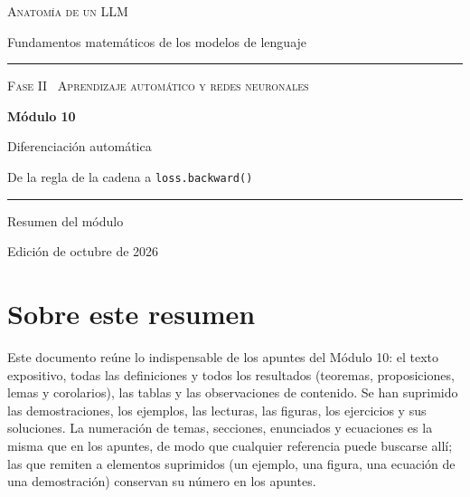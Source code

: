 \documentclass[11pt,a4paper,twoside,openany]{book}
\begin{document}
\frontmatter
\begin{titlepage}
\centering
\vspace*{2.5cm}
{\large\scshape Anatomía de un LLM}\par
\vspace{0.4cm}
{\normalsize Fundamentos matemáticos de los modelos de lenguaje}\par
\vspace{2.2cm}
\rule{\textwidth}{0.8pt}\par\vspace{0.5cm}
{\small\scshape Fase II \textperiodcentered\ Aprendizaje automático y redes neuronales}\par\vspace{0.3cm}
{\Huge\bfseries Módulo 10\par}\vspace{0.3cm}
{\LARGE Diferenciación automática\par}
\vspace{0.2cm}
{\large De la regla de la cadena a \texttt{loss.backward()}\par}
\vspace{0.5cm}\rule{\textwidth}{0.4pt}\par
\vspace{1.6cm}
{\large Resumen del módulo}\par
\vfill
{\small Edición de octubre de 2026}\par
\end{titlepage}

\chapter*{Sobre este resumen}

Este documento reúne lo indispensable de los apuntes del Módulo 10: el texto expositivo, todas las definiciones y todos los resultados (teoremas, proposiciones, lemas y corolarios), las tablas y las observaciones de contenido. Se han suprimido las demostraciones, los ejemplos, las lecturas, las figuras, los ejercicios y sus soluciones. La numeración de temas, secciones, enunciados y ecuaciones es la misma que en los apuntes, de modo que cualquier referencia puede buscarse allí; las que remiten a elementos suprimidos (un ejemplo, una figura, una ecuación de una demostración) conservan su número en los apuntes.
\end{document}
